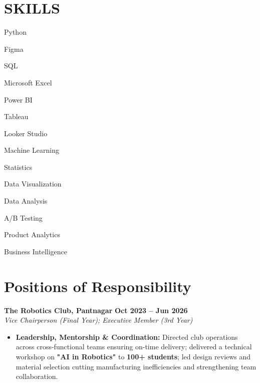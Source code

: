 \documentclass[9pt]{article}
\begin{document}
\section*{SKILLS}
\begin{itemize*}[label=\textbullet, itemjoin={\hspace{0.5cm}}, leftmargin=0pt]
    \item Python
    \item Figma
    \item SQL
    \item Microsoft Excel
    \item Power BI
    \item Tableau
    \item Looker Studio
    \item Machine Learning
    \item Statistics
 \item Data Visualization
    \item Data Analysis
    \item A/B Testing
    \item Product Analytics
    \item Business Intelligence
\end{itemize*}

\section*{Positions of Responsibility}
\noindent \textbf{The Robotics Club, Pantnagar} \hfill \textbf{Oct 2023 -- Jun 2026} \\
\textit{Vice Chairperson (Final Year); Executive Member (3rd Year)}
{\small
\begin{itemize}[leftmargin=*, nosep, topsep=1.5pt]
\item \textbf{Leadership, Mentorship \& Coordination:} Directed club operations across cross-functional teams ensuring on-time delivery; delivered a technical workshop on \textbf{"AI in Robotics"} to \textbf{100+ students}; led design reviews and material selection cutting manufacturing inefficiencies and strengthening team collaboration.
\end{itemize}
}
\end{document}
